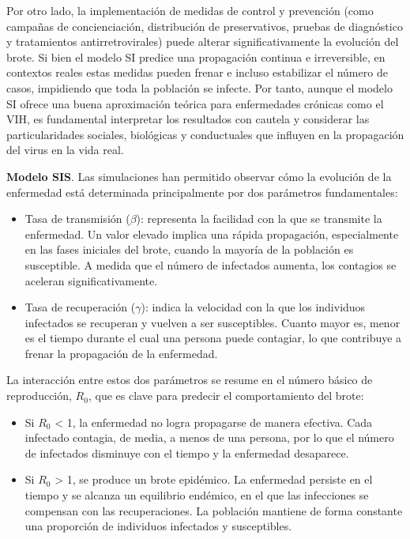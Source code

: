 Por otro lado, la implementación de medidas de control y prevención (como campañas de concienciación, distribución de preservativos, pruebas de diagnóstico y tratamientos antirretrovirales) puede alterar significativamente la evolución del brote. Si bien el modelo SI predice una propagación continua e irreversible, en contextos reales estas medidas pueden frenar e incluso estabilizar el número de casos, impidiendo que toda la población se infecte.
Por tanto, aunque el modelo SI ofrece una buena aproximación teórica para enfermedades crónicas como el VIH, es fundamental interpretar los resultados con cautela y considerar las particularidades sociales, biológicas y conductuales que influyen en la propagación del virus en la vida real.
\vspace{2em}

\textbf{Modelo SIS}.
Las simulaciones han permitido observar cómo la evolución de la enfermedad está determinada principalmente por dos parámetros fundamentales:
\begin{itemize}
    \item Tasa de transmisión ($\beta$): representa la facilidad con la que se transmite la enfermedad. Un valor elevado implica una rápida propagación, especialmente en las fases iniciales del brote, cuando la mayoría de la población es susceptible. A medida que el número de infectados aumenta, los contagios se aceleran significativamente.
    \item Tasa de recuperación ($\gamma$): indica la velocidad con la que los individuos infectados se recuperan y vuelven a ser susceptibles. Cuanto mayor es, menor es el tiempo durante el cual una persona puede contagiar, lo que contribuye a frenar la propagación de la enfermedad.
\end{itemize}
La interacción entre estos dos parámetros se resume en el número básico de reproducción, $R_0$, que es clave para predecir el comportamiento del brote:
\begin{itemize}
    \item Si $R_0$ < 1, la enfermedad no logra propagarse de manera efectiva. Cada infectado contagia, de media, a menos de una persona, por lo que el número de infectados disminuye con el tiempo y la enfermedad desaparece.
    \item Si $R_0$ > 1, se produce un brote epidémico. La enfermedad persiste en el tiempo y se alcanza un equilibrio endémico, en el que las infecciones se compensan con las recuperaciones. La población mantiene de forma constante una proporción de individuos infectados y susceptibles.
\end{itemize}
